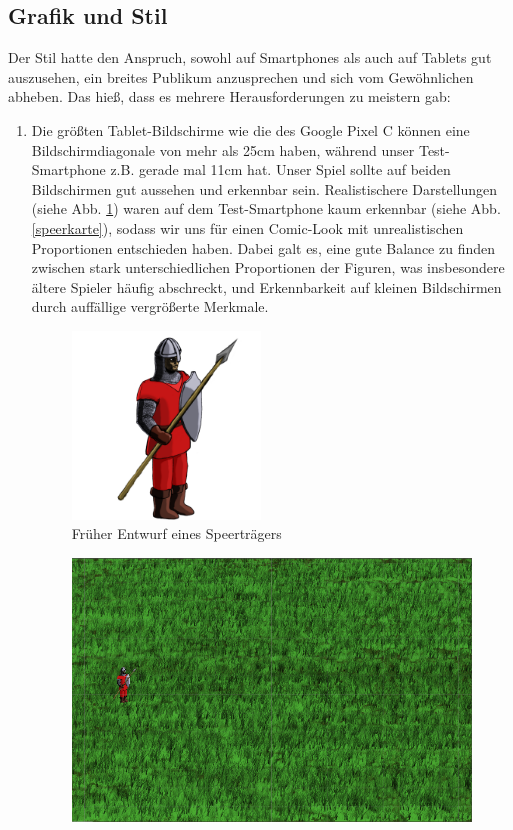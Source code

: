 \documentclass[extern,palatino]{cgBA}
\begin{document}
\subsection{Grafik und Stil}
Der Stil hatte den Anspruch, sowohl auf Smartphones als auch auf Tablets gut auszusehen, ein breites Publikum anzusprechen und sich vom Gewöhnlichen abheben. Das hieß, dass es mehrere Herausforderungen zu meistern gab:
\begin{enumerate}
	\item 
	Die größten Tablet-Bildschirme wie die des Google Pixel C können eine Bildschirmdiagonale von mehr als 25cm haben, während unser Test-Smartphone z.B. gerade mal 11cm hat. Unser Spiel sollte auf beiden Bildschirmen gut aussehen und erkennbar sein. Realistischere Darstellungen (siehe Abb. \ref{speerträger}) waren auf dem Test-Smartphone kaum erkennbar (siehe Abb. \ref{speerkarte}), sodass wir uns für einen Comic-Look mit unrealistischen Proportionen entschieden haben. Dabei galt es, eine gute Balance zu finden zwischen stark unterschiedlichen Proportionen der Figuren, was insbesondere ältere Spieler häufig abschreckt, und Erkennbarkeit auf kleinen Bildschirmen durch auffällige vergrößerte Merkmale.
	\begin{figure}[H]
		\centering
		\includegraphics[height=5cm]{soldier.png}
		\caption{Früher Entwurf eines Speerträgers}
		\label{speerträger}
	\end{figure}
	\begin{figure}[H]
		\centering
		\includegraphics[width=13cm]{soldierbackground.png}

\end{figure}
\end{enumerate}
\end{document}
